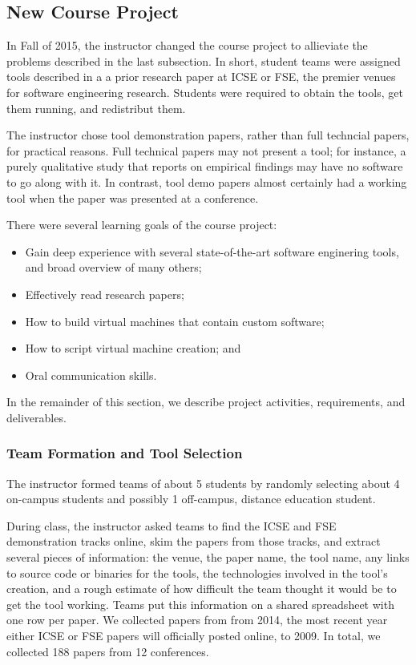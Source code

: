 \documentclass{sig-alternate-05-2015}
\begin{document}
\subsection{New Course Project}

In Fall of 2015, the instructor changed the course project
to allieviate the problems described in the last subsection.
In short, student teams were assigned tools described in a 
a prior research paper at ICSE or FSE, the premier 
venues for software engineering research.
Students were required to obtain the tools, get them running,
and redistribut them.

The instructor chose tool demonstration papers, rather than
full techncial papers, for practical reasons.
Full technical papers may not present a tool; for 
instance, a purely qualitative study that reports on 
empirical findings may have no software to go along with it.
In contrast, tool demo papers almost certainly had a working
tool when the paper was presented at a conference. 

There were several learning goals of the course project:

\begin{itemize}
  \item Gain deep experience with several state-of-the-art
  		software enginering tools, and broad overview of many others;
  \item Effectively read research papers;
  \item How to build virtual machines that contain custom
  		software;
  \item How to script virtual machine creation; and
  \item Oral communication skills. 
\end{itemize}

In the remainder of this section, we describe project
activities, requirements, and deliverables.

\subsubsection{Team Formation and Tool Selection}

The instructor formed teams of about 5 students by randomly
selecting about 4 on-campus students and possibly 1 off-campus, distance
education student.

During class, the instructor asked teams to find the ICSE
and FSE demonstration tracks online, skim the papers from those
tracks, and extract several pieces of information:
the venue, the paper name, the tool name, any links to source
code or binaries for the tools, the technologies involved in the 
tool's creation, and a rough estimate of how 
difficult the team thought it would be to get the tool working.
Teams put this information on a shared spreadsheet with one row per paper.
We collected papers from from 2014, the most recent year either ICSE or FSE
papers will officially posted online, to 2009.
In total, we collected 188 papers from 12 conferences.
\end{document}

